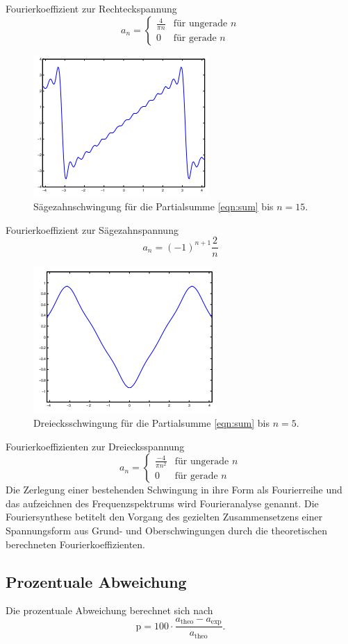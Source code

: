 Fourierkoeffizient zur Rechteckspannung
\begin{equation}
  a_n =
  \begin{cases}
      \frac{4}{\pi n} & \text{für ungerade } n\\
      0 & \text{für gerade } n
  \end{cases}
  \label{eqn:rechteck}
\end{equation}
\begin{figure}[H]
  \centering
  \includegraphics{content/images/saege_theo_n=15.png}
  \caption{Sägezahnschwingung für die Partialsumme \eqref{eqn:sum} bis $n=15$\cite{koeff}.}
  \label{fig:saege_theo}
\end{figure}
Fourierkoeffizient zur Sägezahnspannung
\begin{equation}
  a_n = (-1)^{n+1}\frac{2}{n}
  \label{eqn:saege}
\end{equation}
\begin{figure}[H]
  \centering
  \includegraphics{content/images/dreieck_theo_n=5.png}
  \caption{Dreiecksschwingung für die Partialsumme \eqref{eqn:sum} bis $n=5$\cite{koeff}.}
  \label{fig:dreieck_theo}
\end{figure}
Fourierkoeffizienten zur Dreiecksspannung
\begin{equation}
  a_n =
  \begin{cases}
    \frac{-4}{\pi n^2} & \text{für ungerade }n\\
    0 & \text{für gerade }n
  \end{cases}
  \label{eqn:dreieck}
\end{equation}
Die Zerlegung einer bestehenden Schwingung in ihre Form als Fourierreihe
und das aufzeichnen des Frequenzspektrums wird Fourieranalyse genannt.
Die Fouriersynthese betitelt den Vorgang des gezielten Zusammensetzens
einer Spannungsform aus Grund- und Oberschwingungen durch die theoretischen
berechneten Fourierkoeffizienten.

\subsection{Prozentuale Abweichung}
Die prozentuale Abweichung berechnet sich nach
\begin{equation}
  \text{p} = 100\cdot \frac{a_\text{theo}-a_\text{exp}}{a_\text{theo}}.
\end{equation}
